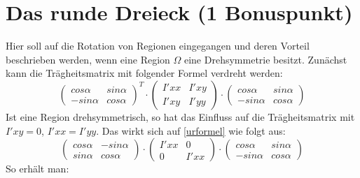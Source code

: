 \documentclass{ezb}
\begin{document}
\section{Das runde Dreieck (1 Bonuspunkt)}
Hier soll auf die Rotation von Regionen eingegangen und deren Vorteil beschrieben werden, wenn eine Region $\Omega$ eine Drehsymmetrie besitzt. Zunächst kann die Trägheitsmatrix mit folgender Formel verdreht werden:\\
\begin{equation}
\begin{pmatrix}
cos \alpha & sin \alpha \\
-sin \alpha & cos \alpha 
\end{pmatrix}^{T}
\cdot
\begin{pmatrix}
I'xx & I'xy \\
I'xy & I'yy 
\end{pmatrix}
\cdot
\begin{pmatrix}
cos \alpha & sin \alpha \\
-sin \alpha & cos \alpha 
\end{pmatrix}
\label{urformel}
\end{equation}
\linebreak
Ist eine Region drehsymmetrisch, so hat das Einfluss auf die Trägheitsmatrix mit $I'xy = 0$, $I'xx = I'yy$. Das wirkt sich auf \eqref{urformel} wie folgt aus:\\
\begin{equation}
\begin{pmatrix}
cos \alpha & -sin \alpha \\
sin \alpha & cos \alpha 
\end{pmatrix}
\cdot
\begin{pmatrix}
I'xx & 0 \\
0 & I'xx 
\end{pmatrix}
\cdot
\begin{pmatrix}
cos \alpha & sin \alpha \\
-sin \alpha & cos \alpha 
\end{pmatrix}
\label{drehformel}
\end{equation}
\linebreak
So erhält man:\\
\end{document}
